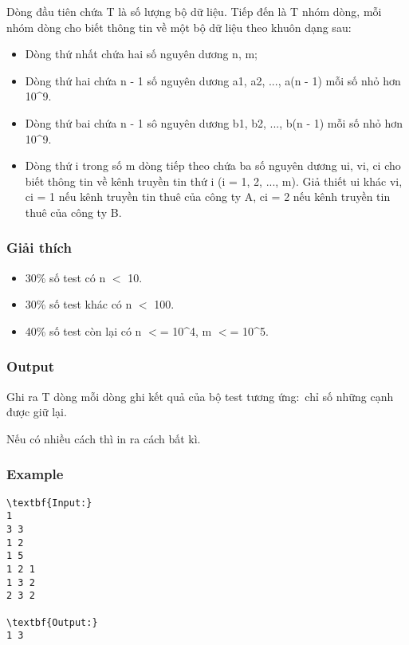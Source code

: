Dòng đầu tiên chứa T là số lượng bộ dữ liệu. Tiếp đến là T nhóm dòng, mỗi nhóm dòng cho biết thông tin về một bộ dữ liệu theo khuôn dạng sau:
\begin{itemize}
	\item Dòng thứ nhất chứa hai số nguyên dương n, m;
	\item Dòng thứ hai chứa n - 1 số nguyên dương a1, a2, ..., a(n - 1) mỗi số nhỏ hơn 10\textasciicircum9.
	\item Dòng thứ bai chứa n - 1 sô nguyên dương b1, b2, ..., b(n - 1) mỗi số nhỏ hơn 10\textasciicircum9.
	\item Dòng thứ i trong số m dòng tiếp theo chứa ba số nguyên dương ui, vi, ci cho biết thông tin về kênh truyền tin thứ i (i = 1, 2, ..., m). Giả thiết ui khác vi, ci = 1 nếu kênh truyền tin thuê của công ty A, ci = 2 nếu kênh truyền tin thuê của công ty B.
\end{itemize}

\subsubsection{Giải thích}
\begin{itemize}
	\item 30\% số test có n $<$ 10.
	\item 30\% số test khác có n $<$ 100.
	\item 40\% số test còn lại có n $<$= 10\textasciicircum4, m $<$= 10\textasciicircum5.
\end{itemize}

\subsubsection{Output}

Ghi ra T dòng mỗi dòng ghi kết quả của bộ test tương ứng: chỉ số những cạnh được giữ lại.

Nếu có nhiều cách thì in ra cách bất kì.

\subsubsection{Example}
\begin{verbatim}
\textbf{Input:}
1
3 3
1 2
1 5
1 2 1
1 3 2
2 3 2

\textbf{Output:}
1 3
\end{verbatim}